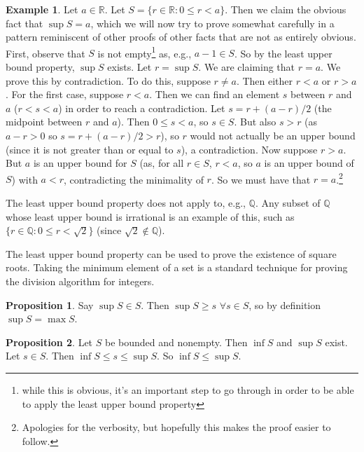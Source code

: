 \documentclass{article}
\theoremstyle{definition}
\newtheorem{example}{Example}[section]
\newtheorem{proposition}{Proposition}[section]
\begin{document}
\begin{example} \label{supexample}
Let $a \in \mathbb{R}$. Let $S = \{r \in \mathbb{R} : 0 \leq r < a\}$. Then we claim the obvious fact that $\sup S = a$, which we will now try to prove somewhat carefully in a pattern reminiscent of other proofs of other facts that are not as entirely obvious. First, observe that $S$ is not empty\footnote{while this is obvious, it's an important step to go through in order to be able to apply the least upper bound property} as, e.g., $a - 1 \in S$. So by the least upper bound property, $\sup S$ exists. Let $r = \sup S$. We are claiming that $r = a$. We prove this by contradiction. To do this, suppose $r \neq a$. Then either $r < a$ or $r > a$. For the first case, suppose $r < a$. Then we can find an element $s$ between $r$ and $a$ ($r < s < a$) in order to reach a contradiction. Let $s = r + (a - r)/2$ (the midpoint between $r$ and $a$). Then $0 \leq s < a$, so $s \in S$. But also $s > r$ (as $a - r > 0$ so $s = r + (a - r)/2 > r$), so $r$ would not actually be an upper bound (since it is not greater than or equal to $s$), a contradiction. Now suppose $r > a$. But $a$ is an upper bound for $S$ (as, for all $r \in S$, $r < a$, so $a$ is an upper bound of $S$) with $a < r$, contradicting the minimality of $r$. So we must have that $r = a$.\footnote{Apologies for the verbosity, but hopefully this makes the proof easier to follow.}
\end{example}

The least upper bound property does not apply to, e.g., $\mathbb{Q}$. Any subset of $\mathbb{Q}$ whose least upper bound is irrational is an example of this, such as $\{r \in \mathbb{Q} : 0 \leq r < \sqrt{2}\}$ (since $\sqrt{2} \notin \mathbb{Q}$).

The least upper bound property can be used to prove the existence of square roots. Taking the minimum element of a set is a standard technique for proving the division algorithm for integers. 

\begin{proposition}
Say $\sup S \in S$. Then $\sup S \ge s$ $\forall s \in S$, so by definition $\sup S = \max S$.
\end{proposition}

\begin{proposition} \label{bound-comparison}
Let $S$ be bounded and nonempty. Then $\inf S$ and $\sup S$ exist. Let $s \in S$. Then $\inf S \le s \le \sup S$.
So $\inf S \le \sup S$.
\end{proposition}
\end{document}
